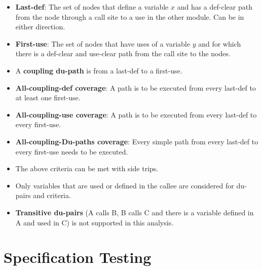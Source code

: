 \documentclass[a4paper]{article}
\begin{document}
\begin{itemize}
    \item \textbf{Last-def}: The set of nodes that define a variable $x$ and has a def-clear path from the node through a call site to a use in the other module. Can be in either direction.
    \item \textbf{First-use}: The set of nodes that have uses of a variable $y$ and for which there is a def-clear and use-clear path from the call site to the nodes.
    \item A \textbf{coupling du-path} is from a last-def to a first-use.
    \item \textbf{All-coupling-def coverage}: A path is to be executed from every last-def to at least one first-use.
    \item \textbf{All-coupling-use coverage}: A path is to be executed from every last-def to every first-use.
    \item \textbf{All-coupling-Du-paths coverage}: Every simple path from every last-def to every first-use needs to be executed.
    \item The above criteria can be met with side trips.
    \item Only variables that are used or defined in the callee are considered for du-pairs and criteria.
    \item \textbf{Transitive du-pairs} (A calls B, B calls C and there is a variable defined in A and used in C) is not supported in this analysis.
\end{itemize}

\section{Specification Testing}
\end{document}
